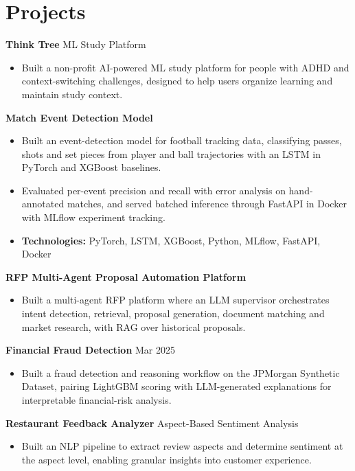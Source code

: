 \documentclass[10pt,a4paper]{article}
\begin{document}
\section{Projects}
\textbf{Think Tree} \textbar{} ML Study Platform\par
\begin{itemize}
  \item Built a non-profit AI-powered ML study platform for people with ADHD and context-switching challenges, designed to help users organize learning and maintain study context.
\end{itemize}
\textbf{Match Event Detection Model}\par
\begin{itemize}
  \item Built an event-detection model for football tracking data, classifying passes, shots and set pieces from player and ball trajectories with an LSTM in PyTorch and XGBoost baselines.
  \item Evaluated per-event precision and recall with error analysis on hand-annotated matches, and served batched inference through FastAPI in Docker with MLflow experiment tracking.
  \item \textbf{Technologies:} PyTorch, LSTM, XGBoost, Python, MLflow, FastAPI, Docker
\end{itemize}
\textbf{RFP Multi-Agent Proposal Automation Platform}\par
\begin{itemize}
  \item Built a multi-agent RFP platform where an LLM supervisor orchestrates intent detection, retrieval, proposal generation, document matching and market research, with RAG over historical proposals.
\end{itemize}
\textbf{Financial Fraud Detection} \textbar{} Mar 2025\par
\begin{itemize}
  \item Built a fraud detection and reasoning workflow on the JPMorgan Synthetic Dataset, pairing LightGBM scoring with LLM-generated explanations for interpretable financial-risk analysis.
\end{itemize}
\textbf{Restaurant Feedback Analyzer} \textbar{} Aspect-Based Sentiment Analysis\par
\begin{itemize}
  \item Built an NLP pipeline to extract review aspects and determine sentiment at the aspect level, enabling granular insights into customer experience.
\end{itemize}
\end{document}
